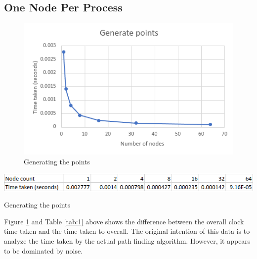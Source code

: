 \documentclass{article}
\begin{document}
\subsection*{One Node Per Process}
\begin{figure}[!htb]
\includegraphics[width=\textwidth]{generate-points.png}
\caption{Generating the points}
\label{fig:1}
\end{figure}
\begin{table}[!htb]
\includegraphics[width=\textwidth]{generate-points-table.png}
\caption{Generating the points}
\label{tab:1}
\end{table}

Figure \ref{fig:1} and Table \ref{tab:1} above shows the difference between the overall clock time taken
and the time taken to overall. The original intention of this data is to analyze the time taken by
the actual path finding algorithm. However, it appears to be dominated by noise.
\end{document}
